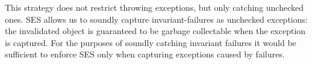 
\noindent This strategy does not restrict throwing exceptions, but only catching unchecked ones.
SES allows us to soundly capture invariant-failures as unchecked exceptions: 
the invalidated object is guaranteed to be garbage collectable when the exception is captured. For the purposes of soundly catching invariant failures it would be sufficient to enforce SES only when capturing exceptions caused by \Q@invariant@ failures.





% 



\loseSpace


